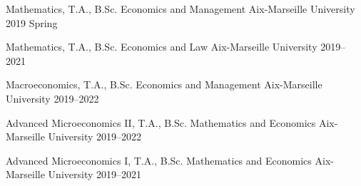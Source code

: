 \begin{cvhonors}
  \cvhonor
    {Mathematics{\normalfont,}} %
    {T.A., B.Sc. Economics and Management} %
    {Aix-Marseille University} %
    {2019 Spring} %
    
  \cvhonor
    {Mathematics{\normalfont,}} %
    {T.A., B.Sc. Economics and Law}%
    {Aix-Marseille University} %
    {2019--2021} %
    
  \cvhonor
    {Macroeconomics{\normalfont,}} %
    {T.A., B.Sc. Economics and Management} %
    {Aix-Marseille University} %
    {2019--2022} %
    
  \cvhonor
    {Advanced Microeconomics II{\normalfont,}} %
    {T.A., B.Sc. Mathematics and Economics} %
    {Aix-Marseille University} %
    {2019--2022} %

  \cvhonor
    {Advanced Microeconomics I{\normalfont,}} %
    {T.A., B.Sc. Mathematics and Economics} %
    {Aix-Marseille University} %
    {2019--2021} %


\end{cvhonors}
